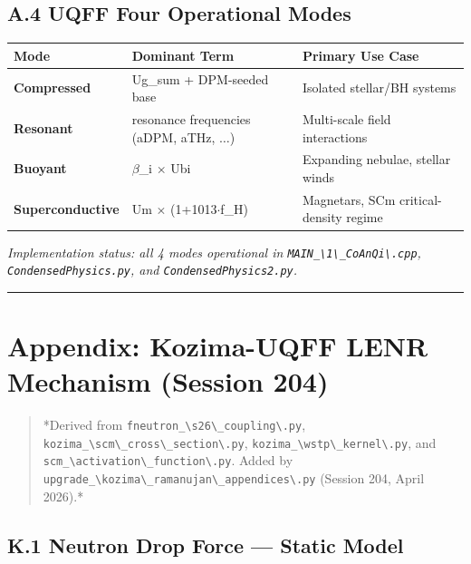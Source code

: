 \documentclass[12pt,a4paper]{article}
\begin{document}
\subsection{A.4 UQFF Four Operational Modes}

\begin{table}[H]
\centering
\small
\begin{tabularx}{\linewidth}{@{}>{\raggedright\arraybackslash}X>{\raggedright\arraybackslash}X>{\raggedright\arraybackslash}X@{}}
\toprule
Mode & Dominant Term & Primary Use Case \tabularnewline
\midrule
\textbf{Compressed} & Ug\_sum + DPM-seeded base & Isolated stellar/BH systems \tabularnewline
\textbf{Resonant} & 5 resonance frequencies (aDPM, aTHz, $\ldots${}) & Multi-scale field interactions \tabularnewline
\textbf{Buoyant} & $\beta$\_i $\times$ Ubi & Expanding nebulae, stellar winds \tabularnewline
\textbf{Superconductive} & Um $\times$ (1+1013$\cdot$f\_H) & Magnetars, SCm critical-density regime \tabularnewline
\bottomrule
\end{tabularx}
\end{table}

\emph{Implementation status: all 4 modes operational in \texttt{MAIN\_\textbackslash {1\textbackslash \_CoAnQi\textbackslash }.cpp}, \texttt{CondensedPhysics.py}, and \texttt{CondensedPhysics2.py}.}

\medskip\hrule\medskip

\section{Appendix: Kozima-UQFF LENR Mechanism (Session 204)}

\begin{quote}
*Derived from \texttt{fneutron\_\textbackslash {s26\textbackslash \_coupling\textbackslash }.py}, \texttt{kozima\_\textbackslash {scm\textbackslash \_cross\textbackslash \_section\textbackslash }.py},
\texttt{kozima\_\textbackslash {wstp\textbackslash \_kernel\textbackslash }.py}, and \texttt{scm\_\textbackslash {activation\textbackslash \_function\textbackslash }.py}. Added by
\texttt{upgrade\_\textbackslash {kozima\textbackslash \_ramanujan\textbackslash \_appendices\textbackslash }.py} (Session 204, April 2026).*
\end{quote}

\subsection{K.1 Neutron Drop Force --- Static Model}
\end{document}
